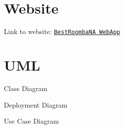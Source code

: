 \hypertarget{Development_web}{}\section{Website}\label{Development_web}
Link to website\+: \href{../../../MQTTwebapp/basicMQTTwebapp/mqtt.html}{\tt Best\+Roomba\+NA Web\+App}\hypertarget{Development_uml_sect}{}\section{U\+ML}\label{Development_uml_sect}
Class Diagram 

Deployment Diagram 

Use Case Diagram  